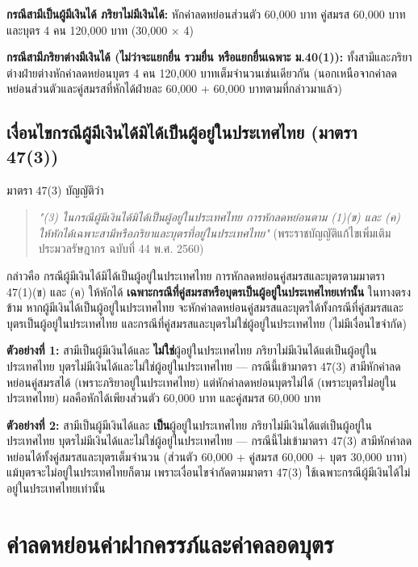 \documentclass[12pt,a4paper]{article}
\newcommand{\hilight}[1]{\textbf{#1}}
\begin{document}
\textbf{กรณีสามีเป็นผู้มีเงินได้ ภริยาไม่มีเงินได้:} หักค่าลดหย่อนส่วนตัว 60,000 บาท คู่สมรส 60,000 บาท และบุตร 4 คน 120,000 บาท (30,000 $\times$ 4)

\textbf{กรณีสามีภริยาต่างมีเงินได้ (ไม่ว่าจะแยกยื่น รวมยื่น หรือแยกยื่นเฉพาะ ม.40(1)):} ทั้งสามีและภริยาต่างฝ่ายต่างหักค่าลดหย่อนบุตร 4 คน 120,000 บาทเต็มจำนวนเช่นเดียวกัน (นอกเหนือจากค่าลดหย่อนส่วนตัวและคู่สมรสที่หักได้ฝ่ายละ 60,000 + 60,000 บาทตามที่กล่าวมาแล้ว)

\subsection*{เงื่อนไขกรณีผู้มีเงินได้มิได้เป็นผู้อยู่ในประเทศไทย (มาตรา 47(3))}

มาตรา 47(3) บัญญัติว่า

\begin{quote}
\textit{"(3) ในกรณีผู้มีเงินได้มิได้เป็นผู้อยู่ในประเทศไทย การหักลดหย่อนตาม (1)(ข) และ (ค) ให้หักได้เฉพาะสามีหรือภริยาและบุตรที่อยู่ในประเทศไทย"} (พระราชบัญญัติแก้ไขเพิ่มเติมประมวลรัษฎากร ฉบับที่ 44 พ.ศ. 2560)
\end{quote}

กล่าวคือ กรณีผู้มีเงินได้มิได้เป็นผู้อยู่ในประเทศไทย การหักลดหย่อนคู่สมรสและบุตรตามมาตรา 47(1)(ข) และ (ค) ให้หักได้ \hilight{เฉพาะกรณีที่คู่สมรสหรือบุตรเป็นผู้อยู่ในประเทศไทยเท่านั้น} ในทางตรงข้าม หากผู้มีเงินได้เป็นผู้อยู่ในประเทศไทย จะหักค่าลดหย่อนคู่สมรสและบุตรได้ทั้งกรณีที่คู่สมรสและบุตรเป็นผู้อยู่ในประเทศไทย และกรณีที่คู่สมรสและบุตรไม่ใช่ผู้อยู่ในประเทศไทย (ไม่มีเงื่อนไขจำกัด)

\textbf{ตัวอย่างที่ 1:} สามีเป็นผู้มีเงินได้และ \hilight{ไม่ใช่}ผู้อยู่ในประเทศไทย ภริยาไม่มีเงินได้แต่เป็นผู้อยู่ในประเทศไทย บุตรไม่มีเงินได้และไม่ใช่ผู้อยู่ในประเทศไทย --- กรณีนี้เข้ามาตรา 47(3) สามีหักค่าลดหย่อนคู่สมรสได้ (เพราะภริยาอยู่ในประเทศไทย) แต่หักค่าลดหย่อนบุตรไม่ได้ (เพราะบุตรไม่อยู่ในประเทศไทย) ผลคือหักได้เพียงส่วนตัว 60,000 บาท และคู่สมรส 60,000 บาท

\textbf{ตัวอย่างที่ 2:} สามีเป็นผู้มีเงินได้และ \hilight{เป็น}ผู้อยู่ในประเทศไทย ภริยาไม่มีเงินได้แต่เป็นผู้อยู่ในประเทศไทย บุตรไม่มีเงินได้และไม่ใช่ผู้อยู่ในประเทศไทย --- กรณีนี้ไม่เข้ามาตรา 47(3) สามีหักค่าลดหย่อนได้ทั้งคู่สมรสและบุตรเต็มจำนวน (ส่วนตัว 60,000 + คู่สมรส 60,000 + บุตร 30,000 บาท) แม้บุตรจะไม่อยู่ในประเทศไทยก็ตาม เพราะเงื่อนไขจำกัดตามมาตรา 47(3) ใช้เฉพาะกรณีผู้มีเงินได้ไม่อยู่ในประเทศไทยเท่านั้น

\newpage
\section{ค่าลดหย่อนค่าฝากครรภ์และค่าคลอดบุตร}
\end{document}
